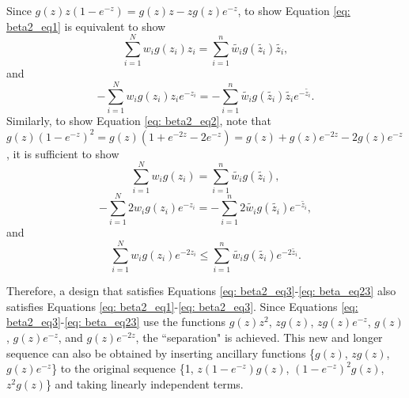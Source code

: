 \documentclass[12pt]{TD-CJS}
\begin{document}
Since $g(z)z(1-e^{-z}) = g(z)z-zg(z)e^{-z}$, to show Equation \eqref{eq: beta2_eq1} is equivalent to show 
\begin{equation}\label{eq: beta_eq11}
\sum_{i=1}^{N} w_i g(z_i)z_i = \sum_{i=1}^{n} \tilde{w_i}  g(\tilde{z_i})\tilde{z_i},\end{equation} 
and  
\begin{equation}\label{eq: beta_eq12}
-\sum_{i=1}^{N} w_i  g(z_i)z_ie^{-z_i} = -\sum_{i=1}^{n} \tilde{w_i} g(\tilde{z_i}) \tilde{z_i}e^{-\tilde{z_i}}.\end{equation} Similarly, to show Equation \eqref{eq: beta2_eq2}, note that $g(z)(1-e^{-z})^2 = g(z)(1+e^{-2z}-2e^{-z}) = g(z)+g(z)e^{-2z}-2g(z)e^{-z}$, it is sufficient to show 
\begin{equation}\label{eq: beta_eq21}
\sum_{i=1}^{N} w_i g(z_i) = \sum_{i=1}^{n} \tilde{w_i}  g(\tilde{z_i}),\end{equation}
\begin{equation}\label{eq: beta_eq22}
-\sum_{i=1}^{N}2 w_i  g(z_i)e^{-z_i} = -\sum_{i=1}^{n}2 \tilde{w_i} g(\tilde{z_i}) e^{-\tilde{z_i}},
\end{equation}
and
\begin{equation}\label{eq: beta_eq23}
\sum_{i=1}^{N} w_i g(z_i)e^{-2z_i} \le \sum_{i=1}^{n} \tilde{w_i}g(\tilde{z_i})e^{-2\tilde{z_i}}.
\end{equation}


Therefore, a design that satisfies Equations \eqref{eq: beta2_eq3}-\eqref{eq: beta_eq23} also satisfies Equations \eqref{eq: beta2_eq1}-\eqref{eq: beta2_eq3}. Since Equations \eqref{eq: beta2_eq3}-\eqref{eq: beta_eq23} use the functions $g(z)z^2$, $zg(z)$, $zg(z)e^{-z}$, $g(z)$, $g(z)e^{-z}$, and $g(z)e^{-2z}$, the ``separation" is achieved. This new and longer sequence can also be obtained by inserting ancillary functions \{$g(z)$, $zg(z)$, $g(z)e^{-z}$\} to the original sequence \{1,  $z(1-e^{-z})g(z)$,  $(1-e^{-z})^2g(z)$, $z^2g(z)$\} and taking linearly independent terms.
\end{document}
